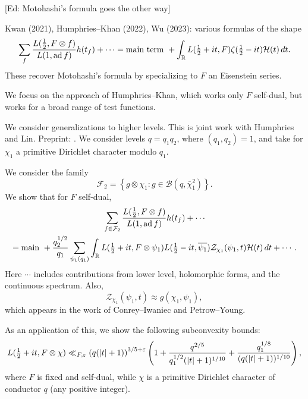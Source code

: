 \documentclass[reqno]{amsart} 
\begin{document}
[Ed: Motohashi's formula goes the other way]

Kwan (2021), Humphries--Khan (2022), Wu (2023): various formulas of the shape
\begin{equation*}
  \sum_f \frac{L(\tfrac{1}{2}, F \otimes f)}{L(1, \operatorname{ad} f)} h(t_f)
  + \dotsb
  = \text{main term } +
  \int_{\mathbb{R}} L(\tfrac{1}{2} + i t, F)
  \zeta(\tfrac{1}{2} - i t) \mathcal{H}(t) \, d t.
\end{equation*}
These recover Motohashi's formula by specializing to $F$ an Eisenstein series.

We focus on the approach of Humphries--Khan, which works only $F$ self-dual, but works for a broad range of test functions.

We consider generalizations to higher levels.  This is joint work with Humphries and Lin.  Preprint: \cite{2024arXiv2408.00596}.  We consider levels $q = q_1 q_2$, where $(q_1, q_2) = 1$, and take for $\chi_1$ a primitive Dirichlet character modulo $q_1$.

We consider the family
\begin{equation*}
  \mathcal{F}_2 = \left\{ g \otimes \chi_1 : g \in \mathcal{B}(q, \bar{\chi}_1^2) \right\}.
\end{equation*}
We show that for $F$ self-dual,
\begin{multline}\label{eq:cnojr4ohm4}
  \sum_{f \in \mathcal{F}_2} \frac{L(\tfrac{1}{2}, F \otimes f)}{L(1, \operatorname{ad} f)} h(t_f)
  + \dotsb
  \\
  = \text{main } +
  \frac{q_2^{1/2}}{ q_1}
  \sum_{\psi_1(q_1)}
  \int_{\mathbb{R}}
  L(\tfrac{1}{2} + i t, F \otimes \psi_1)
  L(\tfrac{1}{2} - i t, \overline{\psi_1})
  \mathcal{Z}_{\chi_1}(\psi_1, t)
  \mathcal{H}(t) \, d t
  + \dotsb.
\end{multline}
Here $\dotsb$ includes contributions from lower level, holomorphic forms, and the continuous spectrum.  Also,
\begin{equation*}
  \mathcal{Z}_{\chi_1}(\psi_1, t) \approx g(\chi_1, \psi_1),
\end{equation*}
which appears in the work of Conrey--Iwaniec and Petrow--Young.

As an application of this, we show the following subconvexity bounds:
\begin{equation*}
  L(\tfrac{1}{2} + i t, F \otimes \chi)
  \ll_{F, \varepsilon}
  \left( q(\lvert t \rvert + 1)\right)^{3/5 + \varepsilon}
  \left(
    1 +
    \frac{q^{2/5} }{q_1^{1/2}(\lvert t \rvert + 1)^{1/10}}
    +
    \frac{q_1^{1/8}}{(q(\lvert t \rvert + 1))^{1/10}}
  \right),
\end{equation*}
where $F$ is fixed and self-dual, while $\chi$ is a primitive Dirichlet character of conductor $q$ (any positive integer).
\end{document}
